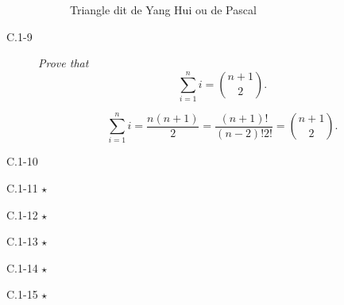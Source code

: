 \begin{description}
\begin{ex}
\begin{figure}[H]
        \caption{Triangle dit de Yang Hui ou de Pascal}
        \label{fig:}
      \end{figure}
    \end{ex}
  \item[C.1-9] {\itshape Prove that \[ \sum_{i=1}^n i = \binom{n+1}{2}.\]}
    \begin{ex}
      \[\sum_{i=1}^ni = \frac{n(n+1)}{2} = \frac{(n+1)!}{(n-2)!2!} = \binom{n+1}{2}.\]
    \end{ex}
  \item[C.1-10] {\itshape }
  \item[C.1-11 $\star$] {\itshape }
  \item[C.1-12 $\star$] {\itshape }
  \item[C.1-13 $\star$] {\itshape }
  \item[C.1-14 $\star$] {\itshape }
  \item[C.1-15 $\star$] {\itshape }
\end{description}
